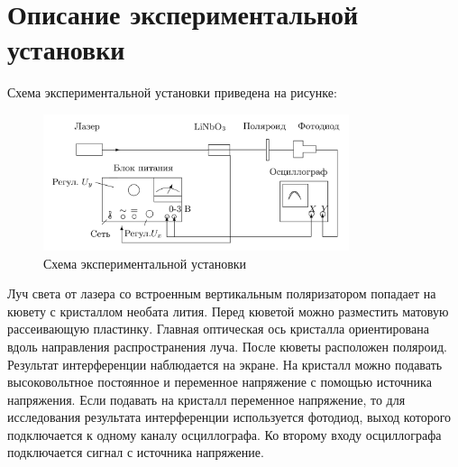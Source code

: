 \section*{Описание экспериментальной установки}

Схема экспериментальной установки приведена на рисунке:

\begin{figure}[H]
	\centering
	\includegraphics[width=0.8\textwidth]{../Изображения/facility.png}
	\caption{Схема экспериментальной установки}
\end{figure}

Луч света от лазера со встроенным вертикальным поляризатором попадает на кювету с кристаллом необата лития. Перед кюветой можно разместить матовую рассеивающую пластинку. Главная оптическая ось кристалла ориентирована вдоль направления распространения луча. После кюветы расположен поляроид. Результат интерференции наблюдается на экране. На кристалл можно подавать высоковольтное постоянное и переменное напряжение с помощью источника напряжения. Если подавать на кристалл переменное напряжение, то для исследования результата интерференции используется фотодиод, выход которого подключается к одному каналу осциллографа. Ко второму входу осциллографа подключается сигнал с источника напряжение.